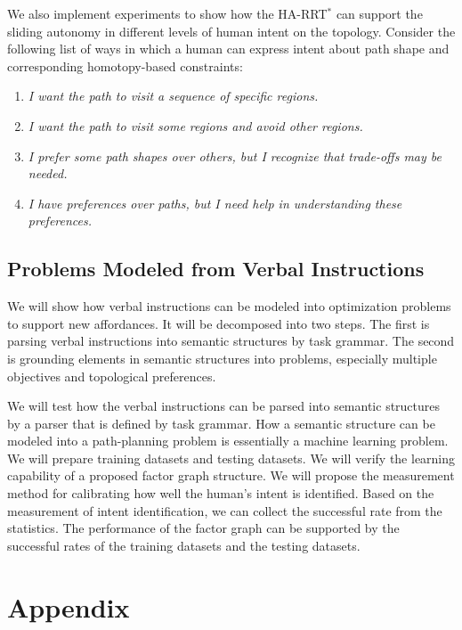 \documentclass[phd]{byuprop}
\begin{document}
We also implement experiments to show how the HA-RRT$^{*}$ can support the sliding autonomy in different levels of human intent on the topology.
Consider the following list of ways in which a human can express intent about path shape and corresponding homotopy-based constraints:
\begin{enumerate}
\item \emph{I want the path to visit a sequence of specific regions.}
\item \emph{I want the path to visit some regions and avoid other regions.}
\item \emph{I prefer some path shapes over others, but I recognize that trade-offs may be needed.} 
\item \emph{I have preferences over paths, but I need help in understanding these preferences.}
\end{enumerate}

\subsection{Problems Modeled from Verbal Instructions}
\label{sec:validation:understanding_verbal_command}

We will show how verbal instructions can be modeled into optimization problems to support new affordances.
It will be decomposed into two steps.
The first is parsing verbal instructions into semantic structures by task grammar.
The second is grounding elements in semantic structures into problems, especially multiple objectives and topological preferences.

We will test how the verbal instructions can be parsed into semantic structures by a parser that is defined by task grammar.
How a semantic structure can be modeled into a path-planning problem is essentially a machine learning problem.
We will prepare training datasets and testing datasets.
We will verify the learning capability of a proposed factor graph structure.
We will propose the measurement method for calibrating how well the human's intent is identified.
Based on the measurement of intent identification, we can collect the successful rate from the statistics.
The performance of the factor graph can be supported by the successful rates of the training datasets and the testing datasets.


\section{Appendix}
\label{sec:appendix}
\end{document}
